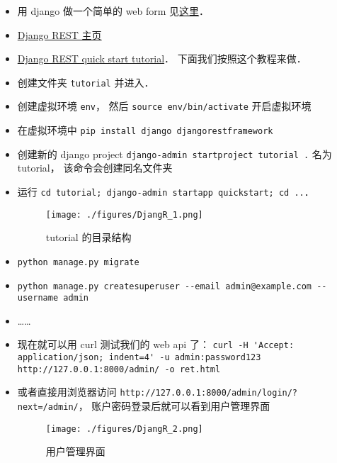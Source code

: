 
\begin{issues}
\issueDraft
\end{issues}

\begin{itemize}
\item 用 django 做一个简单的 web form 见\href{https://www.geeksforgeeks.org/how-to-create-a-form-using-django-forms/}{这里}．
\item \href{https://www.django-rest-framework.org/}{Django REST 主页}
\item \href{https://www.django-rest-framework.org/tutorial/quickstart/}{Django REST quick start tutorial}． 下面我们按照这个教程来做．
\item 创建文件夹 \verb|tutorial| 并进入．
\item 创建虚拟环境 \verb|env|， 然后 \verb|source env/bin/activate| 开启虚拟环境
\item 在虚拟环境中 \verb|pip install django djangorestframework|
\item 创建新的 django project \verb|django-admin startproject tutorial .| 名为 tutorial， 该命令会创建同名文件夹
\item 运行 \verb|cd tutorial; django-admin startapp quickstart; cd ..|．
\begin{figure}[ht]
\centering
\texttt{[image: ./figures/DjangR\_1.png]}
\caption{tutorial 的目录结构} \label{DjangR_fig1}
\end{figure}
\item \verb|python manage.py migrate|
\item \verb|python manage.py createsuperuser --email admin@example.com --username admin|
\item ……
\item 现在就可以用 curl 测试我们的 web api 了： \verb|curl -H 'Accept: application/json; indent=4' -u admin:password123 http://127.0.0.1:8000/admin/ -o ret.html|
\item 或者直接用浏览器访问 \verb|http://127.0.0.1:8000/admin/login/?next=/admin/|， 账户密码登录后就可以看到用户管理界面
\begin{figure}[ht]
\centering
\texttt{[image: ./figures/DjangR\_2.png]}
\caption{用户管理界面} \label{DjangR_fig2}
\end{figure}
\end{itemize}
